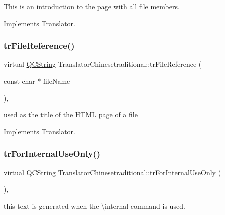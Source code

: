This is an introduction to the page with all file members. 

Implements \mbox{\hyperlink{class_translator}{Translator}}.

\mbox{\label{class_translator_chinesetraditional_a4346906c175fb402dcf1e41e7f920b22}} 
\subsubsection{\texorpdfstring{trFileReference()}{trFileReference()}}
{\footnotesize\ttfamily virtual \mbox{\hyperlink{class_q_c_string}{Q\+C\+String}} Translator\+Chinesetraditional\+::tr\+File\+Reference (\begin{DoxyParamCaption}\item[{const char $\ast$}]{file\+Name }\end{DoxyParamCaption})\hspace{0.3cm}{\ttfamily [inline]}, {\ttfamily [virtual]}}

used as the title of the H\+T\+ML page of a file 

Implements \mbox{\hyperlink{class_translator}{Translator}}.

\mbox{\label{class_translator_chinesetraditional_a4a4be7e08a61015f2354d202a070f2eb}} 
\subsubsection{\texorpdfstring{trForInternalUseOnly()}{trForInternalUseOnly()}}
{\footnotesize\ttfamily virtual \mbox{\hyperlink{class_q_c_string}{Q\+C\+String}} Translator\+Chinesetraditional\+::tr\+For\+Internal\+Use\+Only (\begin{DoxyParamCaption}{ }\end{DoxyParamCaption})\hspace{0.3cm}{\ttfamily [inline]}, {\ttfamily [virtual]}}

this text is generated when the \textbackslash{}internal command is used. 

